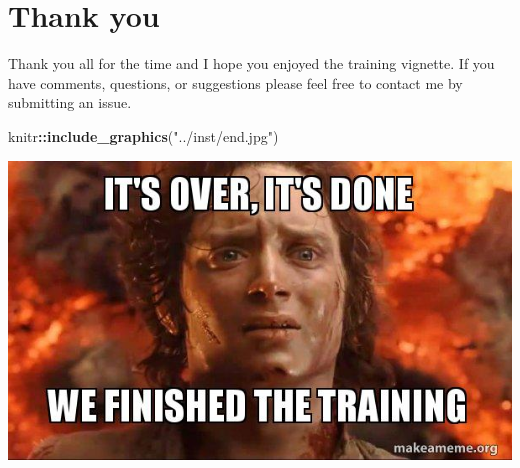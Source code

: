 \documentclass[]{article}
\newenvironment{Shaded}{\begin{snugshade}}{\end{snugshade}}
\newcommand{\CommentTok}[1]{\textcolor[rgb]{0.56,0.35,0.01}{\textit{#1}}}
\newcommand{\DecValTok}[1]{\textcolor[rgb]{0.00,0.00,0.81}{#1}}
\newcommand{\KeywordTok}[1]{\textcolor[rgb]{0.13,0.29,0.53}{\textbf{#1}}}
\newcommand{\NormalTok}[1]{#1}
\newcommand{\OperatorTok}[1]{\textcolor[rgb]{0.81,0.36,0.00}{\textbf{#1}}}
\newcommand{\StringTok}[1]{\textcolor[rgb]{0.31,0.60,0.02}{#1}}
\begin{document}
\begin{Shaded}
\end{Shaded}

\hypertarget{thank-you}{%
\section{Thank you}\label{thank-you}}

Thank you all for the time and I hope you enjoyed the training vignette.
If you have comments, questions, or suggestions please feel free to
contact me by submitting an issue.

\begin{Shaded}
\begin{Highlighting}[]
\NormalTok{knitr}\OperatorTok{::}\KeywordTok{include_graphics}\NormalTok{(}\StringTok{"../inst/end.jpg"}\NormalTok{)}
\end{Highlighting}
\end{Shaded}

\begin{center}\includegraphics[width=8.33in]{../inst/end} \end{center}
\end{document}
